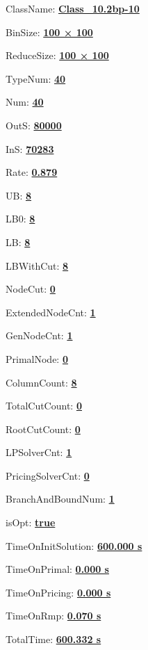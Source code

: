 \documentclass[11pt]{article}
\begin{document}
\pagestyle{empty}


ClassName: \underline{\textbf{Class_10.2bp-10}}
\par
BinSize: \underline{\textbf{100 × 100}}
\par
ReduceSize: \underline{\textbf{100 × 100}}
\par
TypeNum: \underline{\textbf{40}}
\par
Num: \underline{\textbf{40}}
\par
OutS: \underline{\textbf{80000}}
\par
InS: \underline{\textbf{70283}}
\par
Rate: \underline{\textbf{0.879}}
\par
UB: \underline{\textbf{8}}
\par
LB0: \underline{\textbf{8}}
\par
LB: \underline{\textbf{8}}
\par
LBWithCut: \underline{\textbf{8}}
\par
NodeCut: \underline{\textbf{0}}
\par
ExtendedNodeCnt: \underline{\textbf{1}}
\par
GenNodeCnt: \underline{\textbf{1}}
\par
PrimalNode: \underline{\textbf{0}}
\par
ColumnCount: \underline{\textbf{8}}
\par
TotalCutCount: \underline{\textbf{0}}
\par
RootCutCount: \underline{\textbf{0}}
\par
LPSolverCnt: \underline{\textbf{1}}
\par
PricingSolverCnt: \underline{\textbf{0}}
\par
BranchAndBoundNum: \underline{\textbf{1}}
\par
isOpt: \underline{\textbf{true}}
\par
TimeOnInitSolution: \underline{\textbf{600.000 s}}
\par
TimeOnPrimal: \underline{\textbf{0.000 s}}
\par
TimeOnPricing: \underline{\textbf{0.000 s}}
\par
TimeOnRmp: \underline{\textbf{0.070 s}}
\par
TotalTime: \underline{\textbf{600.332 s}}
\par
\newpage


\end{document}

